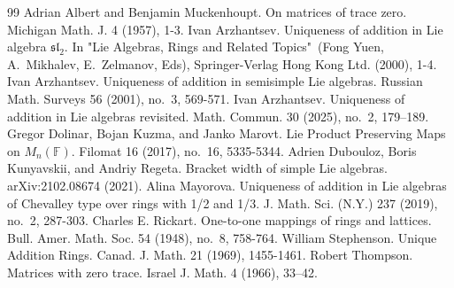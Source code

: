 \documentclass[a4paper,reqno,12pt]{amsart}
\theoremstyle{definition}
\theoremstyle{remark}
\def\FF{{\mathbb F}}
\def\sl{\mathfrak{sl}}
\begin{document}
    \begin{thebibliography}{99}
	Adrian Albert and Benjamin Muckenhoupt. On matrices of trace zero. Michigan Math. J. 4 (1957), 1-3. 
	Ivan Arzhantsev. Uniqueness of addition in Lie algebra $\sl_2$. In "Lie Algebras, Rings and Related Topics"\ (Fong Yuen, A.~Mikhalev, E.~Zelmanov, Eds), Springer-Verlag Hong Kong Ltd. (2000), 1-4. 
	Ivan Arzhantsev. Uniqueness of addition in semisimple Lie algebras. Russian Math. Surveys 56 (2001), no.~3, 569-571.
	Ivan Arzhantsev. Uniqueness of addition in Lie algebras revisited. Math. Commun. 30 (2025), no.~2, 179–189.
	Gregor Dolinar, Bojan Kuzma, and Janko Marovt. Lie Product Preserving Maps on $M_n(\FF)$. Filomat 16 (2017), no.~16, 5335-5344.
	Adrien Dubouloz, Boris Kunyavskii, and Andriy Regeta. Bracket width of simple Lie algebras. arXiv:2102.08674 (2021).
	Alina Mayorova. Uniqueness of addition in Lie algebras of Chevalley type over rings with 1/2 and 1/3. J. Math. Sci. (N.Y.) 237 (2019), no.~2, 287-303. 
	Charles E. Rickart. One-to-one mappings of rings and lattices. Bull. Amer. Math. Soc. 54 (1948), no.~8, 758-764.
	William Stephenson. Unique Addition Rings. Canad. J. Math. 21 (1969), 1455-1461.
	Robert Thompson. Matrices with zero trace. Israel J. Math. 4 (1966), 33–42.
	\end{thebibliography}
\end{document}
